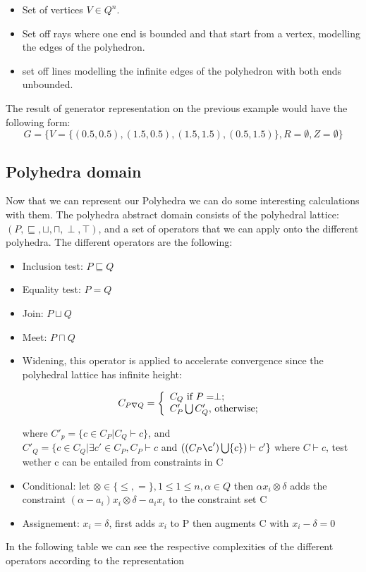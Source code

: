 \begin{itemize}
	\item Set of vertices $V\in Q^n$.
	\item Set off rays where one end is bounded and that start from a vertex, modelling the edges of the polyhedron. 
	\item set off lines modelling the infinite edges of the polyhedron with both ends unbounded.
\end{itemize}
The result of generator representation on the previous example would have the following form: 
\begin{equation}
	G = \{ V = \{(0.5,0.5),(1.5,0.5),(1.5,1.5),(0.5,1.5)\}, R = \emptyset, Z = \emptyset \}
\end{equation}
\subsection{Polyhedra domain}

Now that we can represent our Polyhedra we can do some interesting calculations with them. The polyhedra abstract domain consists of the polyhedral lattice:
	$(P,\sqsubseteq,\sqcup,\sqcap,\perp,\top)$, and a set of operators that we can apply onto the different polyhedra. The different operators are the following:
	\begin{itemize}
		\item Inclusion test: $P \sqsubseteq Q$
		\item Equality test: $P=Q$
		\item Join: $P\sqcup Q$
		\item Meet: $P\sqcap Q$
		\item Widening, this operator is applied to accelerate convergence since the polyhedral lattice has infinite height:
		\begin{center}
		  \[
    C_{P\nabla Q}=\left\{
                \begin{array}{ll}
                  C_Q $ if $P=\perp ;\\
                  C'_P\bigcup C'_Q, $ otherwise$;
                \end{array}
              \right.
  	\]
		
		\end{center}

		where $C'_p=\{c\in C_P |C_Q \vdash c \}$, and\\  $C'_Q=\{c\in C_Q |\exists c' \in C_P,C_P \vdash c $ and $((C_P\c')\bigcup \{c\})\vdash c' \}$
		where $C\vdash c$, test wether c can be entailed from constraints in C
		\item Conditional: let $\otimes \in \{\leq,=\},1\leq 1\leq n,\alpha \in Q$ then $\alpha x_i \otimes \delta$ adds the constraint $(\alpha-a_i)x_i \otimes\delta - a_i x_i$ to the constraint set C
		\item Assignement: $x_i = \delta$, first adds $x_i$ to P then augments C with $x_i -\delta = 0$
		
	\end{itemize}
	 In the following table we can see the respective complexities of the different operators according to the representation
	 
